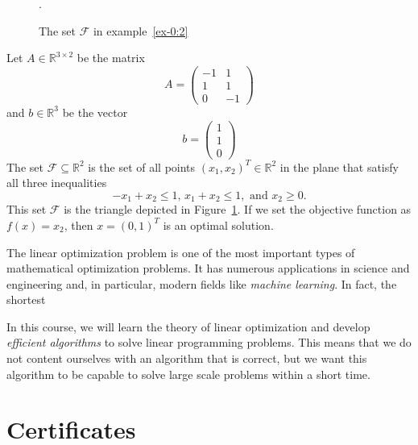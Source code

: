 \begin{example}
  \label{ex-0:2}
    \begin{figure}
      \centering
        
      \caption{The set $ℱ$ in example~\ref{ex-0:2}}. 
      \label{fig:10}
    \end{figure}

  Let $A ∈ ℝ^{3 ×2}$ be the matrix
  \begin{displaymath}
    A =
    \begin{pmatrix}
      -1 & 1 \\
      1 & 1 \\
      0 & -1 
    \end{pmatrix}
  \end{displaymath}
  and $b ∈ ℝ^3$ be the vector
  \begin{displaymath}
    b =
    \begin{pmatrix}
      1 \\ 1 \\ 0
    \end{pmatrix}
  \end{displaymath}
  The set $ℱ ⊆ ℝ^2$ is the set of all points $(x_1,x_2)^T ∈ ℝ^2$ in the plane that satisfy all three inequalities
  \begin{displaymath}
    -x_1+ x_2 ≤1, \,  x_1+ x_2 ≤1, \text{ and } x_2 ≥0. 
  \end{displaymath} This set $ℱ$ is the triangle depicted in Figure~\ref{fig:10}. 
  If we set the objective function as $f(x) = x_2$, then $x = (0,1)^T$ is an optimal solution.   
\end{example}
The linear optimization problem is one of the most important types of mathematical optimization problems. It has numerous applications in science and engineering and, in particular, modern fields like \emph{machine learning}. In fact, the shortest 

In this course, we will learn  the theory of linear optimization and develop \emph{efficient algorithms} to solve linear programming problems. This means that we do not content ourselves with an algorithm that is correct, but we want this algorithm to be capable to solve large scale problems within a short time. 




\section{Certificates}
\label{sec:certificates}


